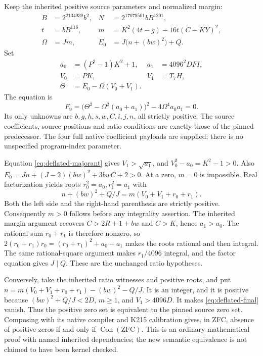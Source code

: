 Keep the inherited positive source parameters and normalized margin:
\begin{align*}
 B&=2^{2134939}b^2,&N&=2^{17079501}bB^{1201},\\
 t&=bB^{116},&m&=K^2(4t-g)-16t(C-KY)^2,\\
 \Omega&=Jm,&E_0&=J\bigl(n+(bw)^2\bigr)+Q.
\end{align*}
Set
\[
\begin{aligned}
 a_0&=(P^2-1)K^2+1,& a_1&=4096^2DFI,\\
 V_0&=PK,& V_1&=T_7H,\\
 \Theta&=E_0-\Omega(V_0+V_1).
\end{aligned}
\]
The equation is
\begin{equation}
 F_9=\bigl(\Theta^2-\Omega^2(a_0+a_1)\bigr)^2
            -4\Omega^4a_0a_1=0.
 \label{eq:deflated-final}
\end{equation}
Its only unknowns are \(b,g,h,s,w,C,i,j,n\), all strictly positive.
The source coefficients, source positions and ratio conditions are exactly
those of the pinned predecessor.  The four full native coefficient
payloads are supplied; there is no unspecified program-index parameter.

Equation \eqref{eq:deflated-majorant} gives \(V_1>\sqrt{a_1}\), and
\(V_0^2-a_0=K^2-1>0\).  Also
\(E_0=Jn+(J-2)(bw)^2+3bwC+2>0\).  At a zero, \(m=0\) is impossible.
Real factorization yields roots \(r_0^2=a_0,r_1^2=a_1\) with
\[
 n+(bw)^2+Q/J=m(V_0+V_1+r_0+r_1).
\]
Both the left side and the right-hand parenthesis are strictly positive.
Consequently \(m>0\) follows before any integrality assertion.  The
inherited margin argument recovers \(C>2R+1+bw\) and \(C>K\), hence
\(a_1>a_0\).  The rational sum \(r_0+r_1\) is therefore nonzero, so
\(2(r_0+r_1)r_0=(r_0+r_1)^2+a_0-a_1\) makes the roots rational and
then integral.  The same rational-square argument makes \(r_1/4096\)
integral, and the factor equation gives \(J\mid Q\).  These are the
unchanged ratio hypotheses.

Conversely, take the inherited ratio witnesses and positive roots, and put
\(n=m(V_0+V_1+r_0+r_1)-(bw)^2-Q/J\).  It is an integer, and it is
positive because \((bw)^2+Q/J<2D\), \(m\geq1\), and
\(V_1>4096D\).  It makes \eqref{eq:deflated-final} vanish.  Thus the
positive zero set is equivalent to the pinned source zero set.  Composing
with its native compiler and K215 calibration gives, in ZFC, absence of
positive zeros if and only if \(\operatorname{Con}(\mathrm{ZFC})\).
This is an ordinary mathematical proof with named inherited dependencies;
the new semantic equivalence is not claimed to have been kernel checked.


